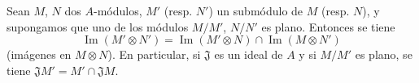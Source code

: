 \begin{env}[6.1.4]
\label{0.6.1.4-fr}
Sean $M$, $N$ dos $A$-módulos, $M'$ (resp. $N'$) un submódulo de $M$
(resp. $N$), y supongamos que uno de los módulos $M/M'$, $N/N'$ es plano.
Entonces se tiene
\[
  \operatorname{Im}(M'\otimes N')
  =\operatorname{Im}(M'\otimes N)\cap\operatorname{Im}(M\otimes N')
\]
(imágenes en $M\otimes N$). En particular, si $\mathfrak{J}$ es un ideal
de $A$ y si $M/M'$ es plano, se tiene
$\mathfrak{J}M'=M'\cap\mathfrak{J}M$.
\end{env}

